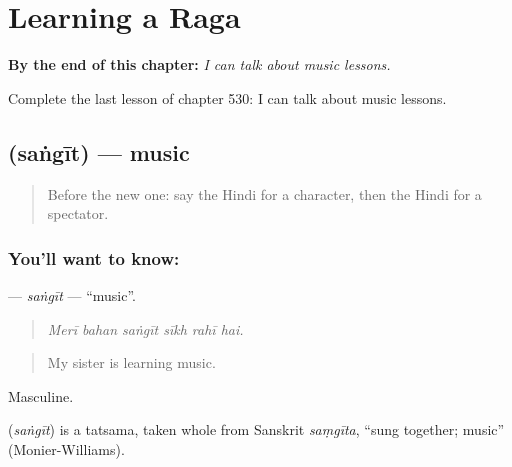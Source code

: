 
\chapter{Learning a Raga}
\label{ch:hi-learning-a-raga}

\begin{chapteropening}
\textbf{By the end of this chapter:} \emph{I can talk about music lessons.}

Complete the last lesson of chapter 530: I can talk about music lessons.
\end{chapteropening}

\section[\texorpdfstring{\hi{संगीत} (saṅgīt)}{संगीत (saṅgīt)}]{ (saṅgīt) — music}

\label{lesson:HI-C530-sangit}



\begin{quote}
Before the new one: say the Hindi for a character, then the Hindi for a spectator.
\end{quote}

\subsection*{You'll want to know: }
\textbf{} — \emph{saṅgīt} — \textquotedblleft{}music\textquotedblright{}.

\begin{quote}
     
\end{quote}

\begin{quote}
\emph{Merī bahan saṅgīt sīkh rahī hai.}
\end{quote}

\begin{quote}
My sister is learning music.
\end{quote}

Masculine.

\begin{cousinweb}
\textbf{} (\emph{saṅgīt}) is a tatsama, taken whole from Sanskrit \emph{saṃgīta}, \textquotedblleft{}sung together; music\textquotedblright{} (Monier-Williams).
\end{cousinweb}


